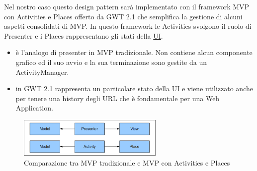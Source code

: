Nel nostro caso questo design pattern sar\`a implementato con il framework MVP con
Activities e Places offerto da GWT 2.1 che semplifica la gestione di alcuni
aspetti consolidati di MVP. In questo framework le Activities svolgono il ruolo
di Presenter e i Places rappresentano gli stati della \underline{UI}.
\begin{itemize}
  \item{ }
  \`e l'analogo di presenter in MVP tradizionale. Non contiene alcun componente
  grafico ed il suo avvio e la sua terminazione sono gestite da un
  ActivityManager.
  \item{ }
   in GWT 2.1 rappresenta un particolare stato della UI e viene
  utilizzato anche per tenere una history degli URL che \`e fondamentale per una
  Web Application.

\end{itemize} 
\begin{figure}[h]
\centering
\includegraphics[width=7cm]{img/ST/mvpap.png}
\caption{Comparazione tra MVP tradizionale e MVP con Activities e Places}
\end{figure}

\newpage

